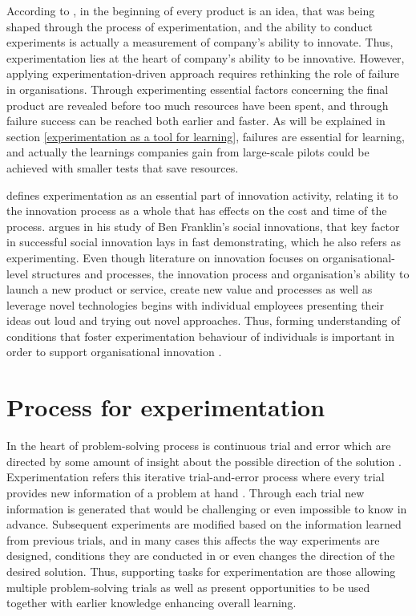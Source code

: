 According to \citet{thomke2001enlightened}, in the beginning of every product is an idea, that was being shaped through the process of experimentation, and the ability to conduct experiments is actually a measurement of company's ability to innovate. Thus, experimentation lies at the heart of company's ability to be innovative. However, applying experimentation-driven approach requires rethinking the role of failure in organisations. Through experimenting essential factors concerning the final product are revealed before too much resources have been spent, and through failure success can be reached both earlier and faster. \citep{thomke2003r} As will be explained in section \ref{experimentation as a tool for learning}, failures are essential for learning, and actually the learnings companies gain from large-scale pilots could be achieved with smaller tests that save resources. \citep{anderson2011step}

\citet{thomke1998managing} defines experimentation as an essential part of innovation activity, relating it to the innovation process as a whole that has effects on the cost and time of the process. \citet{mumford2002social} argues in his study of Ben Franklin's social innovations, that key factor in successful social innovation lays in fast demonstrating, which he also refers as experimenting. Even though literature on innovation focuses on organisational-level structures and processes, the innovation process and organisation's ability to launch a new product or service, create new value and processes as well as leverage novel technologies begins with individual employees presenting their ideas out loud and trying out novel approaches. \citep{argote2000knowledge} Thus, forming understanding of conditions that foster experimentation behaviour of individuals is important in order to support organisational innovation \citep{thomke2003r}. 

\section{Process for experimentation}
In the heart of problem-solving process is continuous trial and error which are directed by some amount of insight about the possible direction of the solution \citep{baron2000thinking}. Experimentation refers this iterative trial-and-error process where every trial provides new information of a problem at hand \citep{thomke1998modes}. Through each trial new information is generated that would be challenging or even impossible to know in advance. Subsequent experiments are modified based on the information learned from previous trials, and in many cases this affects the way experiments are designed, conditions they are conducted in or even changes the direction of the desired solution. \citep{thomke1998modes} Thus, supporting tasks for experimentation are those allowing multiple problem-solving trials as well as present opportunities to be used together with earlier knowledge enhancing overall learning. \citep{lee2004mixed}

